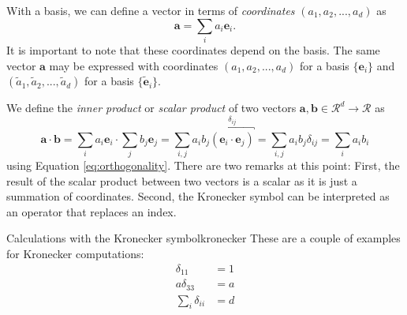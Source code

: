 With a basis, we can define a vector in terms of \emph{coordinates} $(a_1, a_2, ..., a_d)$ as 
\begin{equation}
    \label{eq:coordinates}
    \mathbf{a} = \sum_i a_i \mathbf{e}_i. 
\end{equation}
It is important to note that these coordinates depend on the basis. The same vector $\mathbf{a}$ may be expressed with coordinates $(a_1, a_2, ..., a_d)$ for a basis $\{\mathbf{e}_i\}$ and $(\tilde{a}_1, \tilde{a}_2, ..., \tilde{a}_d)$ for a basis $\{\tilde{\mathbf{e}}_i\}$. 


We define the \emph{inner product} or \emph{scalar product} of two vectors $\mathbf{a}, \mathbf{b} \in \mathcal{R}^d \rightarrow \mathcal{R}$ as 
\begin{equation}
    \mathbf{a} \cdot \mathbf{b} 
        = \sum_i a_i \mathbf{e}_i \cdot \sum_j b_j \mathbf{e}_j 
        =  \sum_{i,j} a_i b_j \overbracket{(\mathbf{e}_i \cdot \mathbf{e}_j)}^{\delta_{ij}} 
        = \sum_{i,j} a_i b_j \delta_{ij} = \sum_{i} a_i b_i
\end{equation}
using Equation \eqref{eq:orthogonality}.
There are two remarks at this point: First, the result of the scalar product between two vectors is a scalar as it is just a summation of coordinates. Second, the Kronecker symbol can be interpreted as an operator that replaces an index.

\begin{example}{Calculations with the Kronecker symbol}{kronecker}
    These are a couple of examples for Kronecker computations: 
    \begin{align}
        \delta_{11}     &= 1\\
        a \delta_{33}   &= a \\
        \sum_i \delta_{ii} &= d 
    \end{align}
\end{example}

